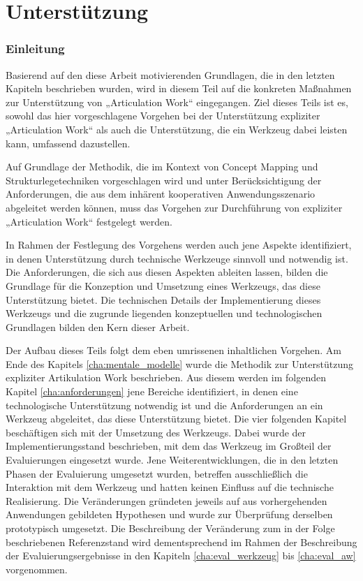 \part{Unterstützung} %
\label{prt:umsetzung}

\section*{Einleitung} %
\label{sec:umsetzung_einleitung}


Basierend auf den diese Arbeit motivierenden Grundlagen, die in den letzten Kapiteln beschrieben wurden, wird in diesem Teil auf die konkreten Maßnahmen zur Unterstützung von „Articulation Work“ eingegangen. Ziel dieses Teils ist es, sowohl das hier vorgeschlagene Vorgehen bei der Unterstützung expliziter „Articulation Work“ als auch die Unterstützung, die ein Werkzeug dabei leisten kann, umfassend dazustellen.

Auf Grundlage der Methodik, die im Kontext von Concept Mapping und Strukturlegetechniken vorgeschlagen wird und unter Berücksichtigung der Anforderungen, die aus dem inhärent kooperativen Anwendungsszenario abgeleitet werden können, muss das Vorgehen zur Durchführung von expliziter „Articulation Work“ festgelegt werden. 

In Rahmen der Festlegung des Vorgehens werden auch jene Aspekte identifiziert, in denen Unterstützung durch technische Werkzeuge sinnvoll und notwendig ist. Die Anforderungen, die sich aus diesen Aspekten ableiten lassen, bilden die Grundlage für die Konzeption und Umsetzung eines Werkzeugs, das diese Unterstützung bietet. Die technischen Details der Implementierung dieses Werkzeugs und die zugrunde liegenden konzeptuellen und technologischen Grundlagen bilden den Kern dieser Arbeit.

Der Aufbau dieses Teils folgt dem eben umrissenen inhaltlichen Vorgehen. Am Ende des Kapitels \ref{cha:mentale_modelle} wurde die Methodik zur Unterstützung expliziter Artikulation Work beschrieben. Aus diesem werden im folgenden Kapitel \ref{cha:anforderungen} jene Bereiche identifiziert, in denen eine technologische Unterstützung notwendig ist und die Anforderungen an ein Werkzeug abgeleitet, das diese Unterstützung bietet. Die vier folgenden Kapitel beschäftigen sich mit der Umsetzung des Werkzeugs. Dabei wurde der Implementierungsstand beschrieben, mit dem das Werkzeug im Großteil der Evaluierungen eingesetzt wurde. Jene Weiterentwicklungen, die in den letzten Phasen der Evaluierung umgesetzt wurden, betreffen ausschließlich die Interaktion mit dem Werkzeug und hatten keinen Einfluss auf die technische Realisierung. Die Veränderungen gründeten jeweils auf aus vorhergehenden Anwendungen gebildeten Hypothesen und wurde zur Überprüfung derselben prototypisch umgesetzt. Die Beschreibung der Veränderung zum in der Folge beschriebenen Referenzstand wird dementsprechend im Rahmen der Beschreibung der Evaluierungsergebnisse in den Kapiteln \ref{cha:eval_werkzeug} bis \ref{cha:eval_aw} vorgenommen.


